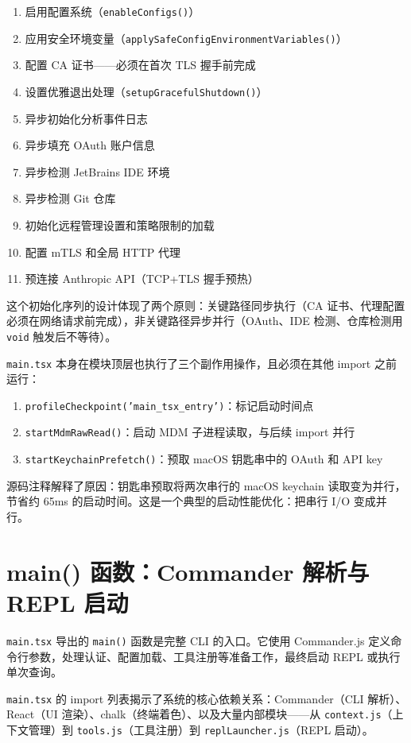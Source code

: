 \begin{enumerate}
  \item 启用配置系统（\texttt{enableConfigs()}）
  \item 应用安全环境变量（\texttt{applySafeConfigEnvironmentVariables()}）
  \item 配置 CA 证书——必须在首次 TLS 握手前完成
  \item 设置优雅退出处理（\texttt{setupGracefulShutdown()}）
  \item 异步初始化分析事件日志
  \item 异步填充 OAuth 账户信息
  \item 异步检测 JetBrains IDE 环境
  \item 异步检测 Git 仓库
  \item 初始化远程管理设置和策略限制的加载
  \item 配置 mTLS 和全局 HTTP 代理
  \item 预连接 Anthropic API（TCP+TLS 握手预热）
\end{enumerate}

这个初始化序列的设计体现了两个原则：关键路径同步执行（CA 证书、代理配置必须在网络请求前完成），非关键路径异步并行（OAuth、IDE 检测、仓库检测用 \texttt{void} 触发后不等待）。

\texttt{main.tsx} 本身在模块顶层也执行了三个副作用操作，且必须在其他 import 之前运行：

\begin{enumerate}
  \item \texttt{profileCheckpoint('main\_tsx\_entry')}：标记启动时间点
  \item \texttt{startMdmRawRead()}：启动 MDM 子进程读取，与后续 import 并行
  \item \texttt{startKeychainPrefetch()}：预取 macOS 钥匙串中的 OAuth 和 API key
\end{enumerate}

源码注释解释了原因：钥匙串预取将两次串行的 macOS keychain 读取变为并行，节省约 65ms 的启动时间。这是一个典型的启动性能优化：把串行 I/O 变成并行。

\section{main() 函数：Commander 解析与 REPL 启动}

\texttt{main.tsx} 导出的 \texttt{main()} 函数是完整 CLI 的入口。它使用 Commander.js 定义命令行参数，处理认证、配置加载、工具注册等准备工作，最终启动 REPL 或执行单次查询。

\texttt{main.tsx} 的 import 列表揭示了系统的核心依赖关系：Commander（CLI 解析）、React（UI 渲染）、chalk（终端着色）、以及大量内部模块——从 \texttt{context.js}（上下文管理）到 \texttt{tools.js}（工具注册）到 \texttt{replLauncher.js}（REPL 启动）。

